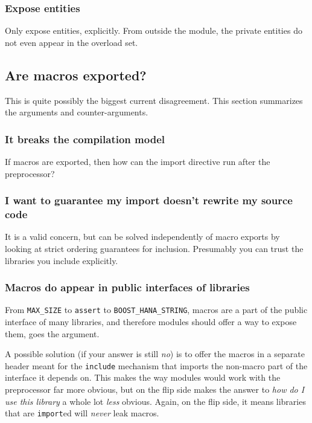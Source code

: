 \documentclass[reqno]{article}
\begin{document}
\subsubsection{Expose entities}
Only expose entities, explicitly. From outside the module, the private entities
do not even appear in the overload set.


\subsection{Are macros exported?}

This is quite possibly the biggest current disagreement. This section summarizes
the arguments and counter-arguments.


\subsubsection{It breaks the compilation model}

If macros are exported, then how can the import directive run after the
preprocessor?

\subsubsection{I want to guarantee my import doesn't rewrite my source code}

It is a valid concern, but can be solved independently of macro exports by
looking at strict ordering guarantees for inclusion. Presumably you can trust
the libraries you include explicitly.

\subsubsection{Macros do appear in public interfaces of libraries}

From \texttt{MAX\_SIZE} to \texttt{assert} to \texttt{BOOST\_HANA\_STRING},
macros are a part of the public interface of many libraries, and therefore
modules should offer a way to expose them, goes the argument.

A possible solution (if your answer is still \emph{no}) is to offer the macros
in a separate header meant for the \texttt{include} mechanism that imports the
non-macro part of the interface it depends on. This makes the way modules would
work with the preprocessor far more obvious, but on the flip side makes the
answer to \emph{how do I use this library} a whole lot \emph{less} obvious.
Again, on the flip side, it means libraries that are \texttt{import}ed will
\emph{never} leak macros.
\end{document}
